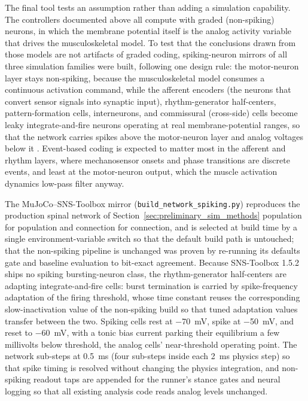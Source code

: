 The final tool tests an assumption rather than adding a simulation capability. The controllers documented above all compute with graded (non-spiking) neurons, in which the membrane potential itself is the analog activity variable that drives the musculoskeletal model. To test that the conclusions drawn from those models are not artifacts of graded coding, spiking-neuron mirrors of all three simulation families were built, following one design rule: the motor-neuron layer stays non-spiking, because the musculoskeletal model consumes a continuous activation command, while the afferent encoders (the neurons that convert sensor signals into synaptic input), rhythm-generator half-centers, pattern-formation cells, interneurons, and commissural (cross-side) cells become leaky integrate-and-fire neurons operating at real membrane-potential ranges, so that the network carries spikes above the motor-neuron layer and analog voltages below it \citep{szczecinski_perspective_2023, nourse_sns_2023}. Event-based coding is expected to matter most in the afferent and rhythm layers, where mechanosensor onsets and phase transitions are discrete events, and least at the motor-neuron output, which the muscle activation dynamics low-pass filter anyway.

The MuJoCo--SNS-Toolbox mirror (\texttt{build\_network\_spiking.py}) reproduces the production spinal network of Section~\ref{sec:preliminary_sim_methods} population for population and connection for connection, and is selected at build time by a single environment-variable switch so that the default build path is untouched; that the non-spiking pipeline is unchanged was proven by re-running its defaults gate and baseline evaluation to bit-exact agreement. Because SNS-Toolbox 1.5.2 ships no spiking bursting-neuron class, the rhythm-generator half-centers are adapting integrate-and-fire cells: burst termination is carried by spike-frequency adaptation of the firing threshold, whose time constant reuses the corresponding slow-inactivation value of the non-spiking build so that tuned adaptation values transfer between the two. Spiking cells rest at \qty{-70}{\mV}, spike at \qty{-50}{\mV}, and reset to \qty{-60}{\mV}, with a tonic bias current parking their equilibrium a few millivolts below threshold, the analog cells' near-threshold operating point. The network sub-steps at \qty{0.5}{\ms} (four sub-steps inside each \qty{2}{\ms} physics step) so that spike timing is resolved without changing the physics integration, and non-spiking readout taps are appended for the runner's stance gates and neural logging so that all existing analysis code reads analog levels unchanged.

